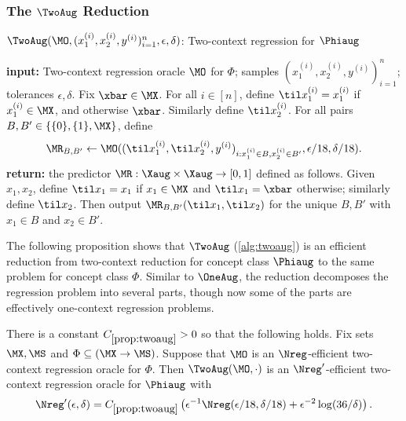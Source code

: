 \subsubsection{The $\TwoAug$ Reduction}\label{sec:twoaug}

\begin{algorithm}[t]
	\caption{$\TwoAug(\MO, (x_1^{(i)},x_2^{(i)},y^{(i)})_{i=1}^n,\epsilon,\delta)$: Two-context regression for $\Phiaug$}
	\label{alg:twoaug}
	\begin{algorithmic}[1]\onehalfspacing
          \State \textbf{input:} Two-context regression oracle $\MO$ for $\Phi$; samples $(x_1^{(i)},x_2^{(i)},y^{(i)})_{i=1}^n$; tolerances $\epsilon,\delta$.
        \State Fix $\xbar \in \MX$.
		\State For all $i \in [n]$, define $\til x_1^{(i)} = x_1^{(i)}$ if $x_1^{(i)} \in \MX$, and otherwise $\xbar$. Similarly define $\til x_2^{(i)}$.
        \State For all pairs $B,B' \in \{\{0\},\{1\},\MX\}$, define
        \[\MR_{B,B'} \gets 
\MO((\til x_1^{(i)},\til x_2^{(i)},y^{(i)})_{i:x_1^{(i)}\in B, x_2^{(i)} \in B'},\epsilon/18,\delta/18).\]
        \State \textbf{return:} the predictor $\MR: \Xaug\times\Xaug \to [0,1]$ defined as follows. Given $x_1,x_2$, define $\til x_1 = x_1$ if $x_1 \in \MX$ and $\til x_1 = \xbar$ otherwise; similarly define $\til x_2$. Then output $\MR_{B,B'}(\til x_1,\til x_2)$ for the unique $B,B'$ with $x_1 \in B$ and $x_2 \in B'$.
	\end{algorithmic}
\end{algorithm}

The following proposition shows that $\TwoAug$ (\cref{alg:twoaug}) is an efficient reduction from two-context reduction for concept class $\Phiaug$ to the same problem for concept class $\Phi$. Similar to $\OneAug$, the reduction decomposes the regression problem into several parts, though now some of the parts are effectively one-context regression problems.

\begin{proposition}\label{prop:twoaug}
There is a constant $C_{\ref{prop:twoaug}}>0$ so that the following holds. Fix sets $\MX,\MS$ and $\Phi \subseteq (\MX \to \MS)$. Suppose that $\MO$ is an $\Nreg$-efficient two-context regression oracle for $\Phi$. Then $\TwoAug(\MO,\cdot)$ is an $\Nreg'$-efficient two-context regression oracle for $\Phiaug$ with
\[\Nreg'(\epsilon,\delta) = C_{\ref{prop:twoaug}}\left(\epsilon^{-1}\Nreg(\epsilon/18,\delta/18) + \epsilon^{-2}\log(36/\delta)\right).\]
\end{proposition}

